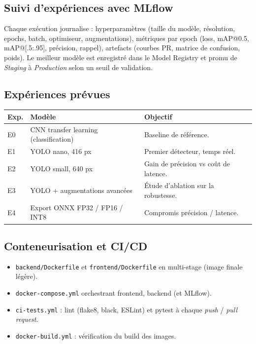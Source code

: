 \documentclass[11pt,a4paper]{article}
\begin{document}
\subsection{Suivi d'expériences avec MLflow}
Chaque exécution journalise : hyperparamètres (taille du modèle, résolution, epochs, batch, optimiseur, augmentations), métriques par epoch (loss, mAP@0.5, mAP@[.5:.95], précision, rappel), artefacts (courbes PR, matrice de confusion, poids). Le meilleur modèle est enregistré dans le Model Registry et promu de \textit{Staging} à \textit{Production} selon un seuil de validation.

\subsection{Expériences prévues}
\begin{center}
\begin{tabular}{@{}llp{6cm}@{}}
\toprule
\textbf{Exp.} & \textbf{Modèle} & \textbf{Objectif} \\ \midrule
E0 & CNN transfer learning (classification) & Baseline de référence. \\
E1 & YOLO nano, 416 px & Premier détecteur, temps réel. \\
E2 & YOLO small, 640 px & Gain de précision vs coût de latence. \\
E3 & YOLO + augmentations avancées & Étude d'ablation sur la robustesse. \\
E4 & Export ONNX FP32 / FP16 / INT8 & Compromis précision / latence. \\ \bottomrule
\end{tabular}
\end{center}

\subsection{Conteneurisation et CI/CD}
\begin{itemize}[leftmargin=*]
  \item \texttt{backend/Dockerfile} et \texttt{frontend/Dockerfile} en multi-stage (image finale légère).
  \item \texttt{docker-compose.yml} orchestrant frontend, backend (et MLflow).
  \item \texttt{ci-tests.yml} : lint (flake8, black, ESLint) et pytest à chaque \textit{push} / \textit{pull request}.
  \item \texttt{docker-build.yml} : vérification du build des images.
\end{itemize}
\end{document}
